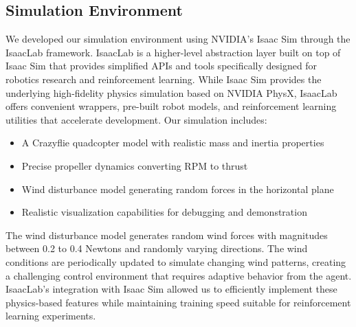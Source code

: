 \documentclass[12pt]{article}
\begin{document}
\subsection{Simulation Environment}

We developed our simulation environment using NVIDIA's Isaac Sim through the IsaacLab framework. IsaacLab is a higher-level abstraction layer built on top of Isaac Sim that provides simplified APIs and tools specifically designed for robotics research and reinforcement learning. While Isaac Sim provides the underlying high-fidelity physics simulation based on NVIDIA PhysX, IsaacLab offers convenient wrappers, pre-built robot models, and reinforcement learning utilities that accelerate development. Our simulation includes:


\begin{itemize}
    \item A Crazyflie quadcopter model with realistic mass and inertia properties
    \item Precise propeller dynamics converting RPM to thrust
    \item Wind disturbance model generating random forces in the horizontal plane
    \item Realistic visualization capabilities for debugging and demonstration
\end{itemize}


The wind disturbance model generates random wind forces with magnitudes between 0.2 to 0.4 Newtons and randomly varying directions. The wind conditions are periodically updated to simulate changing wind patterns, creating a challenging control environment that requires adaptive behavior from the agent. IsaacLab's integration with Isaac Sim allowed us to efficiently implement these physics-based features while maintaining training speed suitable for reinforcement learning experiments.
\end{document}
